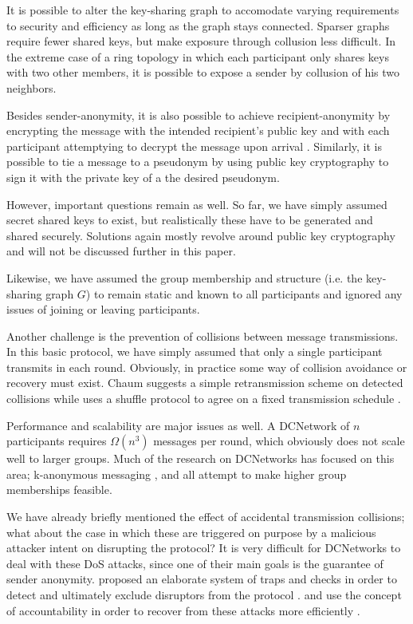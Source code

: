 It is possible to alter the key-sharing graph to accomodate varying requirements to
security and efficiency as long as the graph stays connected. Sparser graphs require fewer
shared keys, but make exposure through collusion less difficult. In the extreme case of
a ring topology in which each participant only shares keys with two other members, it is
possible to expose a sender by collusion of his two neighbors.

Besides sender-anonymity, it is also possible to achieve recipient-anonymity by
encrypting the message with the intended recipient's public key and with each
participant attemptying to decrypt the message upon arrival \cite{journals/joc/Chaum88}.
Similarly, it is possible to tie a message to a pseudonym by using public key cryptography
to sign it with the private key of a the desired pseudonym.

However, important questions remain as well. So far, we have simply assumed secret shared keys
to exist, but realistically these have to be generated and shared securely. Solutions
again mostly revolve around public key cryptography and will not be discussed further in
this paper.

Likewise, we have assumed the group membership and structure (i.e. the key-sharing graph $G$)
to remain static and known to all participants and ignored any issues of joining or leaving participants.

Another challenge is the prevention of collisions between message transmissions.
In this basic protocol, we have simply assumed that only a single participant transmits
in each round. Obviously, in practice some way of collision avoidance or recovery must exist.
Chaum suggests a simple retransmission scheme on detected collisions \cite{journals/joc/Chaum88}
while \Dissent uses a shuffle protocol to agree on
a fixed transmission schedule \cite{journals/corr/abs-1004-3057}.

Performance and scalability are major issues as well. A \ac{DCNetwork} of $n$ participants requires $\Omega(n^3)$ messages per round, which obviously does not scale well to larger groups.
Much of the research on \acp{DCNetwork} has focused on this area; k-anonymous messaging \cite{von2003k},
\Dissent \cite{journals/corr/abs-1004-3057} and \Verdict \cite{corrigan2013proactively}
all attempt to make higher group memberships feasible.

We have already briefly mentioned the effect of accidental transmission collisions; what about the
case in which these are triggered on purpose by a malicious attacker intent on disrupting the
protocol? It is very difficult for \acp{DCNetwork} to deal with these \ac{DoS} attacks,
since one of their main goals is the guarantee of sender anonymity. \citeauthor{journals/joc/Chaum88}
proposed an elaborate system of traps and checks in order to detect and ultimately exclude
disruptors from the protocol \cite{journals/joc/Chaum88}. \Dissent and \Verdict use the concept of
accountability in order to recover from these attacks more efficiently \cite{journals/corr/abs-1004-3057,corrigan2013proactively}.

